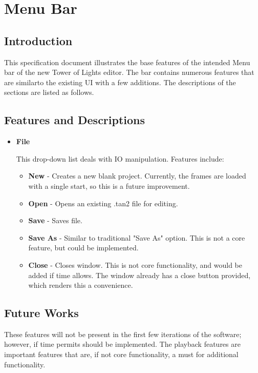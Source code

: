 \documentclass[]{article}
\begin{document}
\section{Menu Bar}



\subsection{Introduction}

{This specification document illustrates the base features of the intended Menu bar of the new Tower of Lights editor. The bar contains numerous features that are similarto the existing UI with a few additions. The descriptions of the sections are listed as follows.}

\subsection{Features and Descriptions}

\begin{itemize}
\item \textbf{File}

{This drop-down list deals with IO manipulation. Features include:}

	\begin{itemize}
	\item \textbf{New} - Creates a new blank project. Currently, the frames are loaded with a single start, so this is a future improvement.
	\item \textbf{Open} - Opens an existing .tan2 file for editing.
	\item \textbf{Save} - Saves file.
	\item \textbf{Save As} - Similar to traditional "Save As" option.  This is not a core feature, but could be implemented.
	\item \textbf{Close} - Closes window.   This is not core functionality, and would be added if time allows.  The window already has a close button provided, which renders this a convenience.


	\end{itemize}


\end{itemize}

\subsection{Future Works}

{These features will not be present in the first few iterations of the software; however, if time permits should be implemented.  The playback features are important features that are, if not core functionality, a must for additional functionality. }
\end{document}
